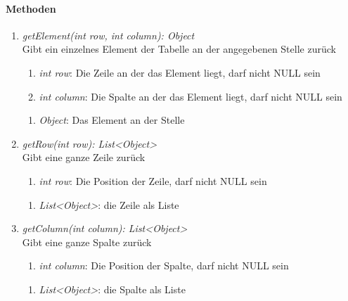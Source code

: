 \paragraph{Methoden}

\begin{enumerate}[+]
	\item \textit{getElement(int row, int column): Object} \\
	Gibt ein einzelnes Element der Tabelle an der angegebenen Stelle zurück
	\begin{enumerate}[$\bullet$]
		\item \textit{int row}: Die Zeile an der das Element liegt, darf nicht NULL sein
		\item \textit{int column}: Die Spalte an der das Element liegt, darf nicht NULL sein
	\end{enumerate}
	\vspace{-0.2cm}
	\begin{enumerate}[$\circ$]
		\item \textit{Object}: Das Element an der Stelle
	\end{enumerate}
	
	\item \textit{getRow(int row): List<Object>} \\
	Gibt eine ganze Zeile zurück
	\begin{enumerate}[$\bullet$]
		\item \textit{int row}: Die Position der Zeile, darf nicht NULL sein
	\end{enumerate}
	\vspace{-0.2cm}
	\begin{enumerate}[$\circ$]
		\item \textit{List<Object>}: die Zeile als Liste
	\end{enumerate}
	
	\item \textit{getColumn(int column): List<Object>} \\
	Gibt eine ganze Spalte zurück
	
	\begin{enumerate}[$\bullet$]
		\item \textit{int column}: Die Position der Spalte, darf nicht NULL sein
	\end{enumerate}
	\vspace{-0.2cm}
	\begin{enumerate}[$\circ$]
		\item \textit{List<Object>}: die Spalte als Liste
	\end{enumerate}
	

\end{enumerate}
